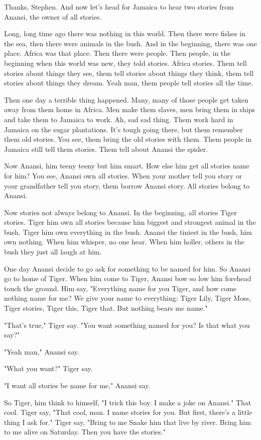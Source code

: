 Thanks, Stephen. And now let's head for Jamaica to hear two stories from Anansi, the owner of all stories.

Long, long time ago there was nothing in this world. Then there were fishes in the sea, then there were animals in the bush. And in the beginning, there was one place. Africa was that place. Then there were people. Then people, in the beginning when this world was new, they told stories. Africa stories. Them tell stories about things they see, them tell stories about things they think, them tell stories about things they dream. Yeah man, them people tell stories all the time.

Then one day a terrible thing happened. Many, many of those people get taken away from them home in Africa. Men make them slaves, men bring them in ships and take them to Jamaica to work. Ah, sad sad thing. Them work hard in Jamaica on the sugar plantations. It's tough going there, but them remember them old stories. You see, them bring the old stories with them. Them people in Jamaica still tell them stories. Them tell about Anansi the spider.

Now Anansi, him teeny teeny but him smart. How else him get all stories name for him? You see, Anansi own all stories. When your mother tell you story or your grandfather tell you story, them borrow Anansi story. All stories belong to Anansi.

Now stories not always belong to Anansi. In the beginning, all stories Tiger stories. Tiger him own all stories because him biggest and strongest animal in the bush. Tiger him own everything in the bush. Anansi the tiniest in the bush, him own nothing. When him whisper, no one hear. When him holler, others in the bush they just all laugh at him.

One day Anansi decide to go ask for something to be named for him. So Anansi go to home of Tiger. When him come to Tiger, Anansi bow so low him forehead touch the ground. Him say, "Everything name for you Tiger, and how come nothing name for me? We give your name to everything: Tiger Lily, Tiger Moss, Tiger stories, Tiger this, Tiger that. But nothing bears me name."

"That's true," Tiger say. "You want something named for you? Is that what you say?"

"Yeah man," Anansi say.

"What you want?" Tiger say.

"I want all stories be name for me," Anansi say.

So Tiger, him think to himself, "I trick this boy. I make a joke on Anansi." That cool. Tiger say, "That cool, man. I name stories for you. But first, there's a little thing I ask for." Tiger say, "Bring to me Snake him that live by river. Bring him to me alive on Saturday. Then you have the stories."

